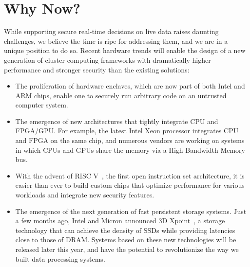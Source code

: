 \section{Why Now?}

While supporting secure real-time decisions on live data raises daunting challenges, we believe the time is ripe for addressing them, and we are in a unique position to do so. Recent hardware trends will enable the design of a new generation of cluster computing frameworks with dramatically higher performance and stronger security than the existing solutions: 

\begin{itemize}[noitemsep,topsep=0pt,parsep=0pt,partopsep=0pt]
\item The proliferation of hardware enclaves, which are now part of both Intel and ARM chips, enable one to securely run arbitrary code on an untrusted computer system.

\item The emergence of new architectures that tightly integrate CPU and FPGA/GPU. For example, the latest Intel Xeon processor integrates CPU and FPGA on the same chip, and numerous vendors are working on systems in which  CPUs and GPUs share the memory via a High Bandwidth Memory bus.  

\item With the advent of RISC V~\cite{risc-v}, the first open instruction set architecture, it is easier than ever to build custom chips that optimize performance for various workloads and integrate new security features.

\item The emergence of the next generation of fast persistent storage systems. Just a few months ago, Intel and Micron announced 3D Xpoint~\cite{3d-xpoint}, a storage technology that can achieve the density of SSDs while providing latencies close to those of DRAM. Systems based on these new technologies will be released later this year, and have the potential to revolutionize the way we built data processing systems.
\end{itemize}

